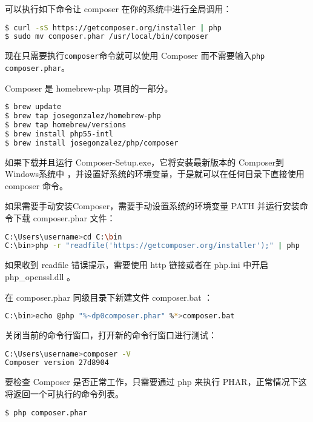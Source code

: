 可以执行如下命令让 composer 在你的系统中进行全局调用：

\begin{lstlisting}[language=bash]
$ curl -sS https://getcomposer.org/installer | php
$ sudo mv composer.phar /usr/local/bin/composer
\end{lstlisting}

现在只需要执行\texttt{composer}命令就可以使用 Composer 而不需要输入\texttt{php composer.phar}。

Composer 是 homebrew-php 项目的一部分。

\begin{lstlisting}[language=bash]
$ brew update
$ brew tap josegonzalez/homebrew-php
$ brew tap homebrew/versions
$ brew install php55-intl
$ brew install josegonzalez/php/composer
\end{lstlisting}

如果下载并且运行 Composer-Setup.exe，它将安装最新版本的 Composer到Windows系统中 ，并设置好系统的环境变量，于是就可以在任何目录下直接使用 composer 命令。

如果需要手动安装Composer，需要手动设置系统的环境变量 PATH 并运行安装命令下载 composer.phar 文件：

\begin{lstlisting}[language=bash]
C:\Users\username>cd C:\bin
C:\bin>php -r "readfile('https://getcomposer.org/installer');" | php
\end{lstlisting}

如果收到 readfile 错误提示，需要使用 http 链接或者在 php.ini 中开启 php\_openssl.dll 。

在 composer.phar 同级目录下新建文件 composer.bat ：

\begin{lstlisting}[language=bash]
C:\bin>echo @php "%~dp0composer.phar" %*>composer.bat
\end{lstlisting}

关闭当前的命令行窗口，打开新的命令行窗口进行测试：

\begin{lstlisting}[language=bash]
C:\Users\username>composer -V
Composer version 27d8904
\end{lstlisting}

要检查 Composer 是否正常工作，只需要通过 php 来执行 PHAR，正常情况下这将返回一个可执行的命令列表。

\begin{lstlisting}[language=bash]
$ php composer.phar
\end{lstlisting}

